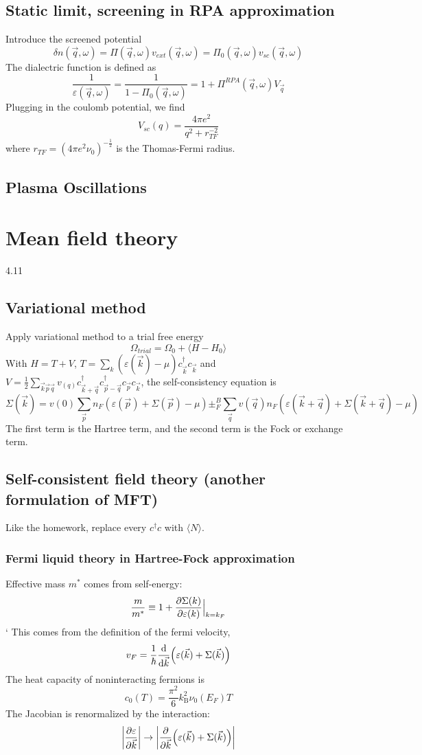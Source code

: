 \documentclass[10pt]{article}
\newcommand{\kb}{k_{\text{B}}}
\begin{document}
\subsection{Static limit, screening in RPA approximation}
Introduce the screened potential
$$
\delta n(\vec q, \omega) = \Pi(\vec q, \omega)v_{ext}(\vec q, \omega) = \Pi_0(\vec q, \omega)v_{sc}(\vec q, \omega)
$$
The dialectric function is defined as
$$
\frac{1}{\varepsilon(\vec q, \omega)}  = \frac{1}{1-\Pi_0(\vec q, \omega)} = 1+\Pi^{RPA}(\vec q, \omega)V_{\vec q}
$$
Plugging in the coulomb potential, we find
$$
V_{sc}(q) = \frac{4\pi e^2}{q^2+r_{TF}^{-2}}
$$
where $r_{TF} = (4\pi e^2 \nu_0)^{-\frac{1}{2}}$ is the Thomas-Fermi radius. 
\subsection{Plasma Oscillations}
\section{Mean field theory}
4.11
\subsection{Variational method}
Apply variational method to a trial free energy
$$
\Omega_{trial} = \Omega_0 + \langle H-H_0\rangle
$$
With $H = T +V$, $T = \sum_k(\varepsilon(\vec k)-\mu)c_{\vec k}^\dagger c_{\vec k}$ and $V = \frac{1}{2}\sum_{\vec k \vec p \vec q} v_(q) c_{\vec k + \vec q}^\dagger c_{\vec p - \vec q}^\dagger c_{\vec p}c_{\vec k}$, the self-consistency equation is 
$$
\Sigma(\vec k) = v(0) \sum_{\vec p}n_F(\varepsilon(\vec p) + \Sigma(\vec p)-\mu) \pm^B_F \sum_{\vec q}v(\vec q) n_F(\varepsilon(\vec k + \vec q)+ \Sigma(\vec k + \vec q)-\mu)
$$
The first term is the Hartree term, and the second term is the Fock or exchange term.
\subsection{Self-consistent field theory (another formulation of MFT)}
Like the homework, replace every $c^\dagger c$ with $\langle N \rangle$.
\subsubsection{Fermi liquid theory in Hartree-Fock approximation}
Effective mass $m^\ast$ comes from self-energy:
$$
\frac{m}{m^\ast} \equiv 1+ \pdv{\Sigma(k)}{\varepsilon(k)}\Big|_{k = k_F}
$$`
This comes from the definition of the fermi velocity,
$$
v_F = \frac{1}{\hbar}\dv{\vec k}(\varepsilon(\vec k)+\Sigma(\vec k))
$$
The heat capacity of noninteracting fermions is
$$
c_0(T) = \frac{\pi^2}{6}\kb^2\nu_0(E_F)T
$$
The Jacobian is renormalized by the interaction:
$$
\qty|\pdv{\varepsilon}{\vec k}| \to \qty|\pdv{\vec k}\qty(\varepsilon(\vec k)+ \Sigma(\vec k))|
$$
\end{document}
